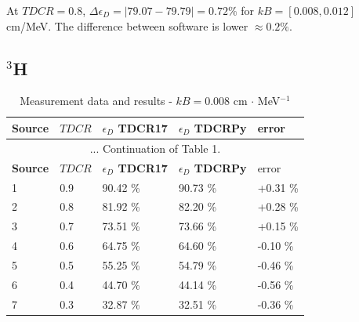 \documentclass[12pt]{iopart}
\begin{document}
At $TDCR = 0.8$, $\Delta \epsilon_D = |79.07 - 79.79| = 0.72 \%$ for $kB = [0.008, 0.012]$ cm/MeV. The difference between software is lower $\approx 0.2 \%$. 

\pagebreak
\subsection{$^{3}$H}

\begingroup
\footnotesize
\begin{longtable}[l]{| p{} | p{} |p{} |p{} |p{} |} 
\caption{Measurement data and results - $kB = 0.008$ cm $\cdot$ MeV$^{-1}$}
\label{Table1} \\ 
\hline
\textbf{Source} & \textbf{$TDCR$} & \textbf{$\epsilon_{D}$ TDCR17} & \textbf{$\epsilon_{D}$ TDCRPy} & error \\
\endfirsthead
\multicolumn{5}{c}{... Continuation of Table 1.}\\ 
\hline
 \textbf{Source} & \textbf{$TDCR$} & \textbf{$\epsilon_{D}$ TDCR17} & \textbf{$\epsilon_{D}$ TDCRPy} & error \\   \hline 
\endhead
\hline
 1 & 0.9   &   90.42 \% &   90.73 \% &  +0.31 \% \\
 2 & 0.8   &   81.92 \% &   82.20 \% &  +0.28 \% \\
 3 & 0.7   &   73.51 \% &   73.66 \% &  +0.15 \% \\
 4 & 0.6   &   64.75 \% &   64.60 \% &  -0.10 \% \\
 5 & 0.5   &   55.25 \% &   54.79 \% &  -0.46 \% \\
 6 & 0.4   &   44.70 \% &   44.14 \% &  -0.56 \% \\
 7 & 0.3   &   32.87 \% &   32.51 \% &  -0.36 \% \\
\hline
\end{longtable} 
\endgroup
\end{document}
